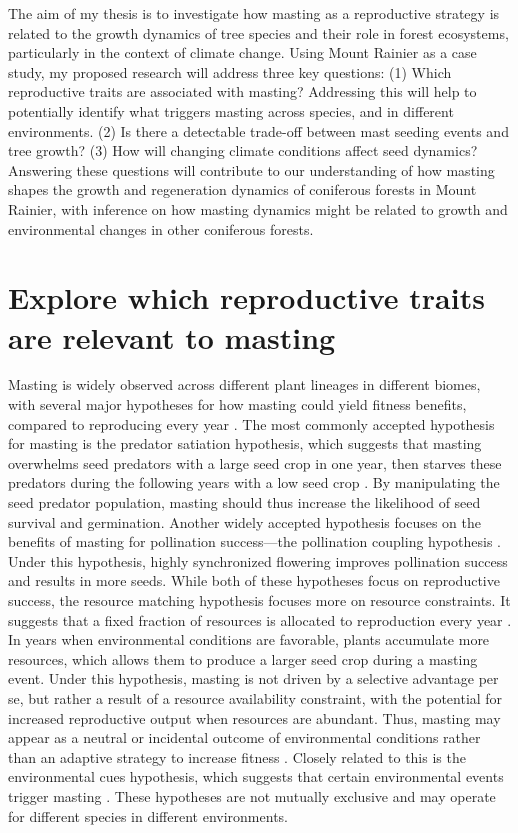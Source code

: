 \documentclass[11pt,letter]{article}
\begin{document}
The aim of my thesis is to investigate how masting as a reproductive strategy is related to the growth dynamics of tree species and their role in forest ecosystems, particularly in the context of climate change. Using Mount Rainier as a case study, my proposed research will address three key questions: (1) Which reproductive traits are associated with masting? Addressing this will help to potentially identify what triggers masting across species, and in different environments. (2) Is there a detectable trade-off between mast seeding events and tree growth? (3) How will changing climate conditions affect seed dynamics? Answering these questions will contribute to our understanding of how masting shapes the growth and regeneration dynamics of coniferous forests in Mount Rainier, with inference on how masting dynamics might be related to growth and environmental changes in other coniferous forests.

\section{Explore which reproductive traits are relevant to masting}
Masting is widely observed across different plant lineages in different biomes, with several major hypotheses for how masting could yield fitness benefits, compared to reproducing every year \citep{koenig2021brief, waller1979models}. The most commonly accepted hypothesis for masting is the predator satiation hypothesis, which suggests that masting overwhelms seed predators with a large seed crop in one year, then starves these predators during the following years with a low seed crop \citep{janzen1971seed}. By manipulating the seed predator population, masting should thus increase the likelihood of seed survival and germination. Another widely accepted hypothesis focuses on the benefits of masting for pollination success---the pollination coupling hypothesis \citep{crone2014resource}. Under this hypothesis, highly synchronized flowering improves pollination success and results in more seeds. While both of these hypotheses focus on reproductive success, the resource matching hypothesis focuses more on resource constraints. It suggests that a fixed fraction of resources is allocated to reproduction every year \citep{kelly1994evolutionary}. In years when environmental conditions are favorable, plants accumulate more resources, which allows them to produce a larger seed crop during a masting event. Under this hypothesis, masting is not driven by a selective advantage per se, but rather a result of a resource availability constraint, with the potential for increased reproductive output when resources are abundant. Thus, masting may appear as a neutral or incidental outcome of environmental conditions rather than an adaptive strategy to increase fitness \citep{isagi1997does}. Closely related to this is the environmental cues hypothesis, which suggests that certain environmental events trigger masting \citep{pearse2016mechanisms}. These hypotheses are not mutually exclusive and may operate for different species in different environments.
\end{document}
